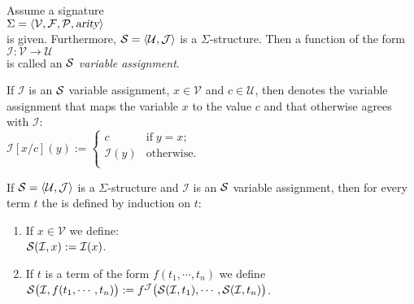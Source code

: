 \begin{Definition}
    Assume a signature \\[0.2cm]
    \hspace*{1.3cm} $\Sigma = \langle \mathcal{V}, \mathcal{F}, \mathcal{P}, \textsl{arity} \rangle$ \\[0.2cm]
    is given.  Furthermore,  $\mathcal{S} = \langle \mathcal{U}, \mathcal{J} \rangle$ is a  $\Sigma$-structure.
    Then a function of the form \\[0.2cm]
    \hspace*{1.3cm} $\mathcal{I}: \mathcal{V} \rightarrow \mathcal{U}$ \\[0.2cm]
    is called an {\color{blue}$\mathcal{S}$ \emph{variable assignment}}.

    If  $\mathcal{I}$ is an $\mathcal{S}$ variable assignment, 
    $x \in \mathcal{V}$ and $c \in \mathcal{U}$, then  denotes the variable assignment
    that maps the variable  $x$ to the value $c$ and that otherwise agrees with $\mathcal{I}$: \\[0.2cm]
    \hspace*{1.3cm} 
    $\mathcal{I}[x/c](y) := \left\{
    \begin{array}{ll}
    c               & \mbox{if}\; y = x;  \\
    \mathcal{I}(y)  & \mbox{otherwise}.          \\
    \end{array}
    \right.$ \eox
\end{Definition}


\begin{Definition}
    If $\struct = \pair(\mathcal{U},\mathcal{J})$ is a  $\Sigma$-structure and $\mathcal{I}$ is an  $\mathcal{S}$
    variable assignment, then for every term $t$ the  
     is defined by induction on $t$:
    \begin{enumerate}
    \item If $x \in \mathcal{V}$ we define: \\[0.2cm]
          \hspace*{1.3cm} $\mathcal{S}(\mathcal{I}, x) := \mathcal{I}(x)$.
    \item If $t$ is a term of the form $f(t_1,\cdots,t_n)$ we define \\[0.2cm]
          \hspace*{1.3cm} $\mathcal{S}\bigl(\mathcal{I}, f(t_1,\cdots,t_n)\bigr) := 
                           f^\mathcal{J}\bigl( \mathcal{S}(\mathcal{I}, t_1), \cdots, \mathcal{S}(\mathcal{I}, t_n) \bigr)$.
                           \eox
    \end{enumerate}
\end{Definition}

